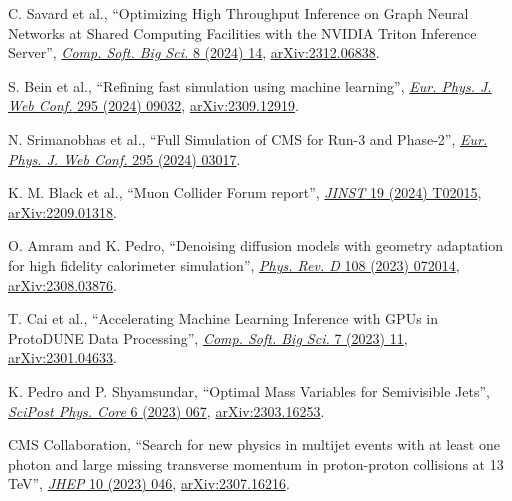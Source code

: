 \begin{description}[leftmargin=12pt,font=\normalfont,labelsep=0em]
\item C. Savard et al., ``Optimizing High Throughput Inference on Graph Neural Networks at Shared Computing Facilities with the NVIDIA Triton Inference Server'', \href{http://doi.org/10.1007/s41781-024-00123-2}{\emph{Comp. Soft. Big Sci.} 8 (2024) 14}, \href{https://arxiv.org/abs/2312.06838}{arXiv:2312.06838}. %
\item \begin{sloppypar}S. Bein et al., ``Refining fast simulation using machine learning'', \href{https://doi.org/10.1051/epjconf/202429509032}{\emph{Eur. Phys. J. Web Conf.} 295 (2024) 09032}, \href{https://arxiv.org/abs/2309.12919}{arXiv:2309.12919}.\end{sloppypar} %
\item N. Srimanobhas et al., ``Full Simulation of CMS for Run-3 and Phase-2'', \href{https://doi.org/10.1051/epjconf/202429503017}{\emph{Eur. Phys. J. Web Conf.} 295 (2024) 03017}. %
\item K. M. Black et al., ``Muon Collider Forum report'', \href{https://doi.org/10.1088/1748-0221/19/02/T02015}{\emph{JINST} 19 (2024) T02015}, \href{https://arxiv.org/abs/2209.01318}{arXiv:2209.01318}. %
\item O. Amram and K. Pedro, ``Denoising diffusion models with geometry adaptation for high fidelity calorimeter simulation'', \href{https://doi.org/10.1103/PhysRevD.108.072014}{\emph{Phys. Rev. D} 108 (2023) 072014}, \href{https://arxiv.org/abs/2308.03876}{arXiv:2308.03876}. %
\item T. Cai et al., ``Accelerating Machine Learning Inference with GPUs in ProtoDUNE Data Processing'', \href{https://doi.org/10.1007/s41781-023-00101-0}{\emph{Comp. Soft. Big Sci.} 7 (2023) 11}, \href{https://arxiv.org/abs/2301.04633}{arXiv:2301.04633}. %
\item \begin{sloppypar}K. Pedro and P. Shyamsundar, ``Optimal Mass Variables for Semivisible Jets'', \href{https://doi.org/10.21468/SciPostPhysCore.6.4.067}{\emph{SciPost Phys. Core} 6 (2023) 067}, \href{https://arxiv.org/abs/2303.16253}{arXiv:2303.16253}.\end{sloppypar} %
\item CMS Collaboration, ``Search for new physics in multijet events with at least one photon and large missing transverse momentum in proton-proton collisions at 13 TeV'', \href{https://doi.org/10.1007/JHEP10(2023)046}{\emph{JHEP} 10 (2023) 046}, \href{https://arxiv.org/abs/2307.16216}{arXiv:2307.16216}. %

\end{description}
